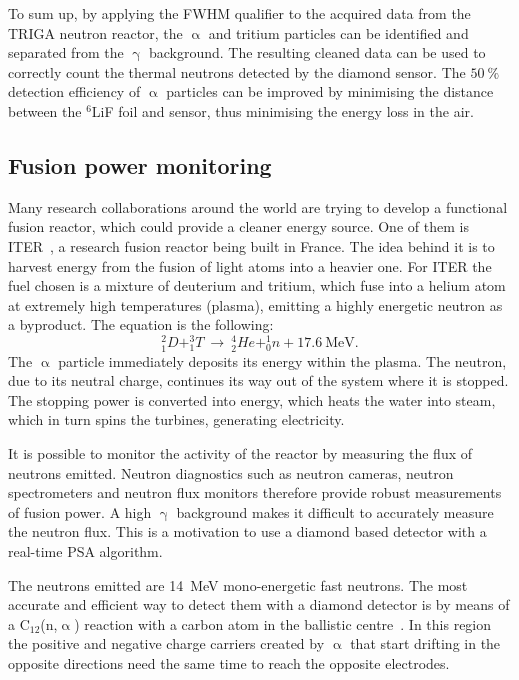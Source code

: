 To sum up, by applying the FWHM qualifier to the acquired data from the TRIGA neutron reactor, the $\upalpha$ and tritium particles can be identified and separated from the $\upgamma$ background. The resulting cleaned data can be used to correctly count the thermal neutrons detected by the diamond sensor. The $50~\%$ detection efficiency of $\upalpha$ particles can be improved by minimising the distance between the $^6$LiF foil and sensor, thus minimising the energy loss in the air.









\newpage\null\thispagestyle{empty}\newpage
\clearpage
\subsection{Fusion power monitoring}
\label{sec:fusion}
Many research collaborations around the world are trying to develop a functional fusion reactor, which could provide a cleaner energy source. One of them is ITER~\cite{ITER:00000}, a research fusion reactor being built in France. The idea behind it is to harvest energy from the fusion of light atoms into a heavier one. For ITER the fuel chosen is a mixture of deuterium and tritium, which fuse into a helium atom at extremely high temperatures (plasma), emitting a highly energetic neutron as a byproduct. The equation is the following:
\begin{equation}
^2_1D+^3_1T ~\rightarrow~ ^4_2He+^1_0n+17.6~\textrm{MeV}.
\end{equation}
The $\upalpha$ particle immediately deposits its energy within the plasma. The neutron, due to its neutral charge, continues its way out of the system where it is stopped. The stopping power is converted into energy, which heats the water into steam, which in turn spins the turbines, generating electricity.

It is possible to monitor the activity of the reactor by measuring the flux of neutrons emitted. Neutron diagnostics such as neutron cameras, neutron spectrometers and neutron flux monitors therefore provide robust measurements of fusion power. A high $\upgamma$ background makes it difficult to accurately measure the neutron flux. This is a motivation to use a diamond based detector with a real-time PSA algorithm.

The neutrons emitted are 14~MeV mono-energetic fast neutrons. The most accurate and efficient way to detect them with a diamond detector is by means of a C$_\mathrm{12}$(n,$\upalpha$) reaction with a carbon atom in the ballistic centre~\cite{PAVEL:00001}. In this region the positive and negative charge carriers created by $\upalpha$ that start drifting in the opposite directions need the same time to reach the opposite electrodes.

